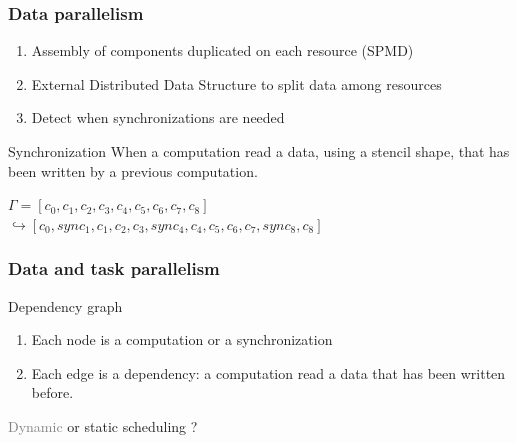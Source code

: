 \documentclass{beamer}
\begin{document}
\begin{frame}
\frametitle{Data parallelism}
\begin{enumerate}
\item Assembly of components duplicated on each resource (SPMD)
\item External Distributed Data Structure to split data among resources
\item Detect when synchronizations are needed
\end{enumerate}

\medskip
\begin{block}{Synchronization}
When a computation read a data, using a stencil shape, that has been written by a previous computation.
\end{block}

$\Gamma = [c_0,c_1,c_2,c_3,c_4,c_5,c_6,c_7,c_8]$\\
$\hookrightarrow [c_0,sync_1,c_1,c_2,c_3,sync_4,c_4,c_5,c_6,c_7,sync_8,c_8]$
\end{frame}

\begin{frame}
\frametitle{Data and task parallelism}

\begin{block}{Dependency graph}
\begin{enumerate}
\item Each node is a computation or a synchronization
\item Each edge is a dependency: a computation read a data that has been written before.
\end{enumerate}
\end{block}

\begin{center}
\end{center}

\begin{center}
\textcolor{gray}{Dynamic} or static scheduling ?
\end{center}
\end{frame}
\end{document}
